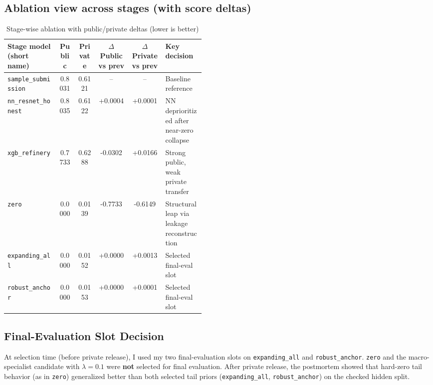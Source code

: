 \subsection{Ablation view across stages (with score deltas)}
\begin{table}[htbp]
\centering
\scriptsize
\caption{Stage-wise ablation with public/private deltas (lower is better)}
\begin{tabular}{p{0.26\linewidth} c c c c p{0.20\linewidth}}
\toprule
Stage model (short name) & Public & Private & $\Delta$Public vs prev & $\Delta$Private vs prev & Key decision \\
\midrule
\texttt{sample\_submission} & 0.8031 & 0.6121 & -- & -- & Baseline reference \\
\texttt{nn\_resnet\_honest} & 0.8035 & 0.6122 & +0.0004 & +0.0001 & NN deprioritized after near-zero collapse \\
\texttt{xgb\_refinery} & 0.7733 & 0.6288 & -0.0302 & +0.0166 & Strong public, weak private transfer \\
\texttt{zero} & 0.0000 & 0.0139 & -0.7733 & -0.6149 & Structural leap via leakage reconstruction \\
\texttt{expanding\_all} & 0.0000 & 0.0152 & +0.0000 & +0.0013 & Selected final-eval slot \\
\texttt{robust\_anchor} & 0.0000 & 0.0153 & +0.0000 & +0.0001 & Selected final-eval slot \\
\bottomrule
\end{tabular}
\end{table}

\subsection{Final-Evaluation Slot Decision}
At selection time (before private release), I used my two final-evaluation slots on \texttt{expanding\_all} and \texttt{robust\_anchor}. \texttt{zero} and the macro-specialist candidate with $\lambda=0.1$ were \textbf{not} selected for final evaluation. After private release, the postmortem showed that hard-zero tail behavior (as in \texttt{zero}) generalized better than both selected tail priors (\texttt{expanding\_all}, \texttt{robust\_anchor}) on the checked hidden split.


